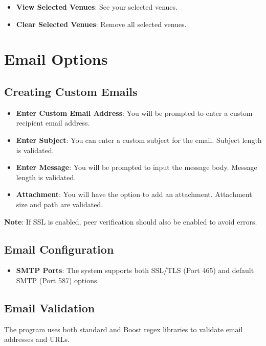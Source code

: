 \documentclass{article}
\begin{document}
	\begin{itemize}
		\item \textbf{View Selected Venues}: See your selected venues.
		\item \textbf{Clear Selected Venues}: Remove all selected venues.
	\end{itemize}
	
	\section{Email Options}
	
	\subsection{Creating Custom Emails}
	
	\begin{itemize}
		\item \textbf{Enter Custom Email Address}: You will be prompted to enter a custom recipient email address.
		\item \textbf{Enter Subject}: You can enter a custom subject for the email. Subject length is validated.
		\item \textbf{Enter Message}: You will be prompted to input the message body. Message length is validated.
		\item \textbf{Attachment}: You will have the option to add an attachment. Attachment size and path are validated.
	\end{itemize}
	
	\textbf{Note}: If SSL is enabled, peer verification should also be enabled to avoid errors.
	
	\subsection{Email Configuration}
	
	\begin{itemize}
		\item \textbf{SMTP Ports}: The system supports both SSL/TLS (Port 465) and default SMTP (Port 587) options.
	\end{itemize}
	
	\subsection{Email Validation}
	
	The program uses both standard and Boost regex libraries to validate email addresses and URLs.
	
\end{document}
